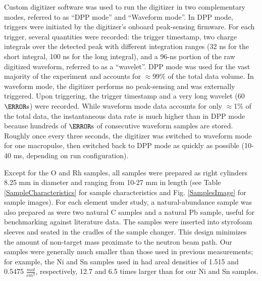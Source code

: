 \documentclass[twocolumn,secnumarabic,amssymb, nobibnotes, aps, prl,
superscriptaddress, nobalancelastpage]{revtex4}
\begin{document}
Custom digitizer software was used to run the 
digitizer in two complementary modes, referred to as ``DPP mode'' and ``Waveform 
mode''. In DPP mode, triggers were initiated by the digitizer's onboard
peak-sensing firmware. For each trigger, several quantities were recorded: the trigger 
timestamp, two charge integrals over the detected peak with different
integration ranges (32 ns for the short integral, 100 ns for the long integral),
and a 96-ns portion of the raw digitized waveform, referred to as a ``wavelet''.
DPP mode was used for the vast majority of the 
experiment and accounts for $\approx$99\% of the total data volume. In waveform mode, 
the digitizer performs no peak-sensing and was externally triggered. Upon 
triggering, the trigger timestamp and a very long wavelet (60 $\micro\second$) 
were recorded. While waveform mode data accounts for only $\approx$1\% of the total data, 
the instantaneous data rate is much higher than in DPP 
mode because hundreds of $\micro\second$ of consecutive waveform samples are 
stored. Roughly once every three seconds, the digitizer was switched to 
waveform mode for one macropulse, then switched back to DPP mode as quickly as
possible (10-40 ms, depending on run configuration).  

Except for the O and Rh samples, all samples were prepared as right
cylinders 8.25 mm in diameter and ranging from 10-27 mm in length (see
Table \ref{SampleCharacteristics} for sample characteristics and Fig. \ref{SamplesImage}
for sample images). For each element under study, a natural-abundance sample
was also prepared as were two natural C
samples and a natural Pb sample, useful for benchmarking against
literature data. The samples
were inserted into styrofoam sleeves and seated in the cradles of the sample
changer. This design minimizes the amount of non-target mass proximate to the
neutron beam path. Our samples were generally
much smaller than those used in previous measurements;
for example, the Ni and Sn samples used in \cite{Abfalterer2001,
Finlay1993} had areal densities of 1.515 and 0.5475
$\frac{mol}{cm^{2}}$, respectively, 12.7 and 6.5 times larger than for our
Ni and Sn samples. 
\end{document}
